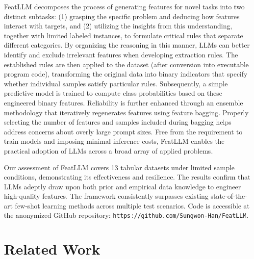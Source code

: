 \textsf{FeatLLM} decomposes the process of generating features for novel tasks into two distinct subtasks: (1) grasping the specific problem and deducing how features interact with targets, and (2) utilizing the insights from this understanding, together with limited labeled instances, to formulate critical rules that separate different categories. By organizing the reasoning in this manner, LLMs can better identify and exclude irrelevant features when developing extraction rules. The established rules are then applied to the dataset (after conversion into executable program code), transforming the original data into binary indicators that specify whether individual samples satisfy particular rules. Subsequently, a simple predictive model is trained to compute class probabilities based on these engineered binary features. Reliability is further enhanced through an ensemble methodology that iteratively regenerates features using feature bagging. Properly selecting the number of features and samples included during bagging helps address concerns about overly large prompt sizes. Free from the requirement to train models and imposing minimal inference costs, \textsf{FeatLLM} enables the practical adoption of LLMs across a broad array of applied problems.

Our assessment of \textsf{FeatLLM} covers 13 tabular datasets under limited sample conditions, demonstrating its effectiveness and resilience. The results confirm that LLMs adeptly draw upon both prior and empirical data knowledge to engineer high-quality features. The framework consistently surpasses existing state-of-the-art few-shot learning methods across multiple test scenarios. Code is accessible at the anonymized GitHub repository: \texttt{https://github.com/Sungwon-Han/FeatLLM}.

\section{Related Work}

